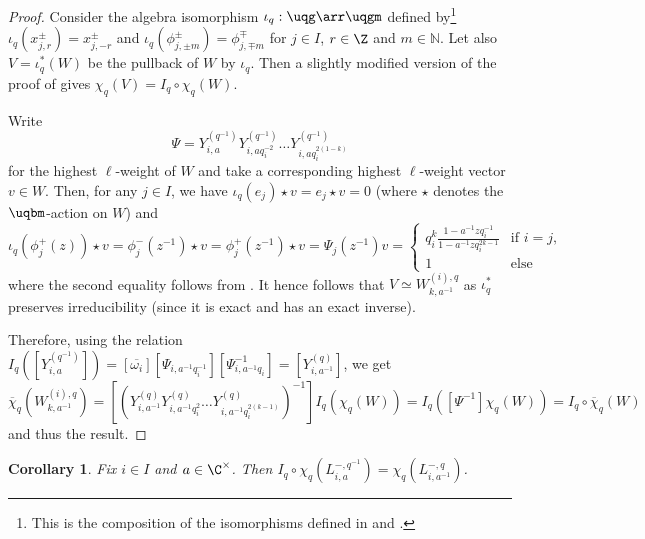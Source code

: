 \documentclass[11pt]{amsart}
\newtheorem{cor}[theorem]{Corollary}
\theoremstyle{definition}
\theoremstyle{remark}
\numberwithin{equation}{section}
\begin{document}
\begin{proof}
Consider the algebra isomorphism $\iota_q : \uqg\arr \uqgm$ defined by\footnote{This is the composition of the isomorphisms defined in \cite[Proposition 2.2]{hj} and \cite[Proposition 1.6]{c}.} $\iota_q(x_{j,r}^{\pm}) = x_{j,-r}^{\pm}$ and $\iota_q(\phi_{j,\pm m}^{\pm})= \phi_{j,\mp m}^{\mp}$ for $j\in I$, $r\in \Z$ and $m\in \mathbb{N}$. Let also $V= \iota_q^*(W)$ be the pullback of $W$ by $\iota_q$. Then a slightly modified version of the proof of \cite[Lemma 4.10]{hSig} gives $\chi_q(V)=I_q\circ\chi_q(W)$. \par Write
$$\Psi = Y_{i,a}^{(q^{-1})}Y_{i,aq_i^{-2}}^{(q^{-1})}\dots Y_{i,aq_i^{2(1-k)}}^{(q^{-1})}$$
for the highest $\ell$-weight of $W$ and take a corresponding highest $\ell$-weight vector $v\in W$. Then, for any $j\in I$, we have $\iota_q(e_j)\star v=e_j\star v= 0$ (where $\star$ denotes the $\uqbm$-action on $W$) and $$\iota_q(\phi_j^+(z))\star v = \phi_j^-(z^{-1})\star v = \phi_j^+(z^{-1}) \star v = \Psi_j(z^{-1})v = \left\{\begin{array}{ll}
q_i^{k}\frac{1-a^{-1} z q_i^{-1}}{1-a^{-1} z q_i^{2k-1}} & \text{if }i=j,\\
1 & \text{else}
\end{array} \right.$$
where the second equality follows from \cite[Theorem 4.10]{hshift}. It hence follows that $V\simeq W_{k,a^{-1}}^{(i),q}$ as $\iota_q^*$ preserves irreducibility (since it is exact and has an exact inverse). \par Therefore, using the relation $I_q([Y_{i,a}^{(q^{-1})}]) = [\overline{\omega_i}][\Psi_{i,a^{-1}q_i^{-1}}][\Psi_{i,a^{-1}q_i}^{-1}] = [Y_{i,a^{-1}}^{(q)}]$, we get
$$ \overline{\chi}_q(W_{k,a^{-1}}^{(i),q})=[(Y_{i,a^{-1}}^{(q)}Y_{i,a^{-1}q_i^2}^{(q)}\dots Y_{i,a^{-1}q_i^{2(k-1)}}^{(q)})^{-1}]I_q(\chi_q(W)) = I_q([\Psi^{-1}]\chi_q(W)) = I_q\circ\overline{\chi}_q(W)$$
and thus the result. 
\end{proof}
\begin{cor}\label{cor:IqNeg} Fix $i\in I$ and $a\in \C^{\times}$. Then $I_q\circ \chi_q(L_{i,a}^{-,q^{-1}}) = \chi_q(L_{i,a^{-1}}^{-,q})$.
\end{cor}
\end{document}
